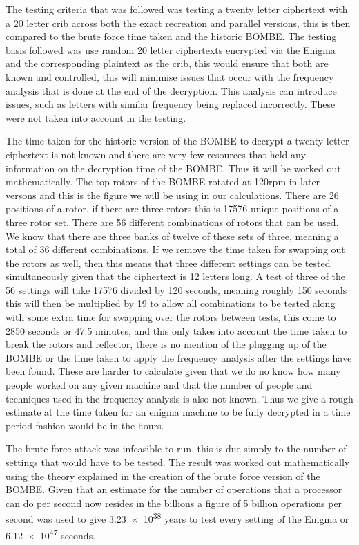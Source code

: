 \documentclass[12pt,a4paper]{article}
\begin{document}
The testing criteria that was followed was testing a twenty letter ciphertext with a 20 letter crib across both the exact recreation and parallel versions, this is then compared to the brute force time taken and the historic BOMBE. The testing basis followed was use random 20 letter ciphertexts encrypted via the Enigma and the corresponding plaintext as the crib, this would ensure that both are known and controlled, this will minimise issues that occur with the frequency analysis that is done at the end of the decryption. This analysis can introduce issues, such as letters with similar frequency being replaced incorrectly. These were not taken into account in the testing.

The time taken for the historic version of the BOMBE to decrypt a twenty letter ciphertext is not known and there are very few resources that held any information on the decryption time of the BOMBE. Thus it will be worked out mathematically. The top rotors of the BOMBE rotated at 120rpm in later versons and this is the figure we will be using in our calculations. There are 26 positions of a rotor, if there are three rotors this is 17576 unique positions of a three rotor set. There are 56 different combinations of rotors that can be used. We know that there are three banks of twelve of these sets of three, meaning a total of 36 different combinations. If we remove the time taken for swapping out the rotors as well, then this means that three different settings can be tested simultaneously given that the ciphertext is 12 letters long. A test of three of the 56 settings will take 17576 divided by 120 seconds, meaning roughly 150 seconds this will then be multiplied by 19 to allow all combinations to be tested along with some extra time for swapping over the rotors between tests, this come to 2850 seconds or 47.5 minutes, and this only takes into account the time taken to break the rotors and reflector, there is no mention of the plugging up of the BOMBE or the time taken to apply the frequency analysis after the settings have been found. These are harder to calculate given that we do no know how many people worked on any given machine and that the number of people and techniques used in the frequency analysis is also not known. Thus we give a rough estimate at the time taken for an enigma machine to be fully decrypted in a time period fashion would be in the hours.

The brute force attack was infeasible to run, this is due simply to the number of settings that would have to be tested. The result was worked out mathematically using the theory explained in the creation of the brute force version of the BOMBE. Given that an estimate for the number of operations that a processor can do per second now resides in the billions a figure of 5 billion operations per second was used to give  \num{3.23e38} years to test every setting of the Enigma or  \num{6.12e47} seconds.
\end{document}
